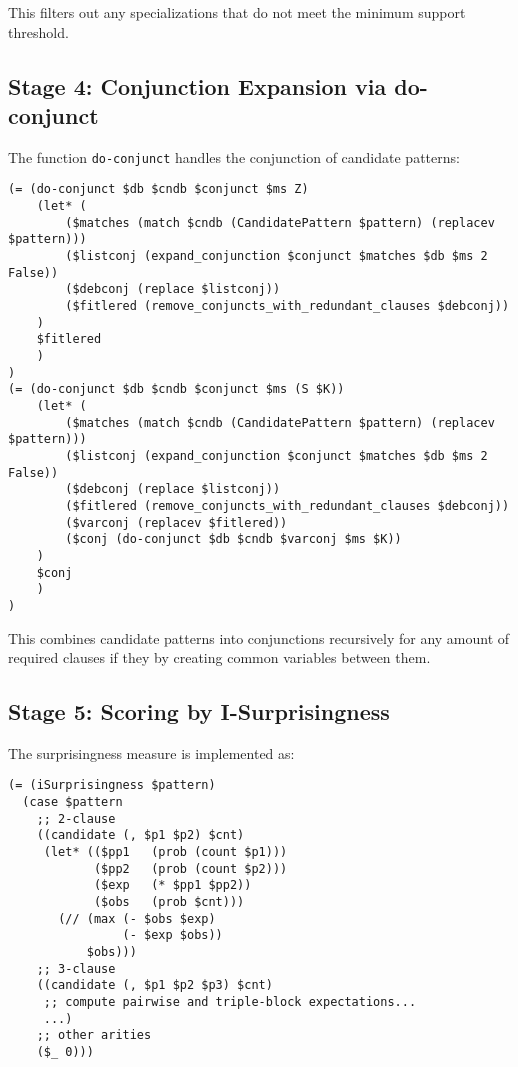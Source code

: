 \documentclass{article}
\begin{document}
This filters out any specializations that do not meet the minimum support threshold.

\subsection{Stage 4: Conjunction Expansion via do-conjunct}

The function \texttt{do-conjunct} handles the conjunction of candidate patterns:

\begin{verbatim}
(= (do-conjunct $db $cndb $conjunct $ms Z)
    (let* (
        ($matches (match $cndb (CandidatePattern $pattern) (replacev $pattern)))
        ($listconj (expand_conjunction $conjunct $matches $db $ms 2 False))
        ($debconj (replace $listconj))
        ($fitlered (remove_conjuncts_with_redundant_clauses $debconj))
    )
    $fitlered
    )
)
(= (do-conjunct $db $cndb $conjunct $ms (S $K))
    (let* (
        ($matches (match $cndb (CandidatePattern $pattern) (replacev $pattern)))
        ($listconj (expand_conjunction $conjunct $matches $db $ms 2 False))
        ($debconj (replace $listconj))
        ($fitlered (remove_conjuncts_with_redundant_clauses $debconj))
        ($varconj (replacev $fitlered))
        ($conj (do-conjunct $db $cndb $varconj $ms $K))
    )
    $conj
    )
)
\end{verbatim}


This combines candidate patterns into conjunctions recursively for any amount of required clauses if they by creating common variables between them.

\subsection{Stage 5: Scoring by I-Surprisingness}

The surprisingness measure is implemented as:

\begin{verbatim}
(= (iSurprisingness $pattern)
  (case $pattern
    ;; 2-clause
    ((candidate (, $p1 $p2) $cnt)
     (let* (($pp1   (prob (count $p1)))
            ($pp2   (prob (count $p2)))
            ($exp   (* $pp1 $pp2))
            ($obs   (prob $cnt)))
       (// (max (- $obs $exp)
                (- $exp $obs))
           $obs)))
    ;; 3-clause
    ((candidate (, $p1 $p2 $p3) $cnt)
     ;; compute pairwise and triple-block expectations...
     ...)
    ;; other arities
    ($_ 0)))
\end{verbatim}
\end{document}
